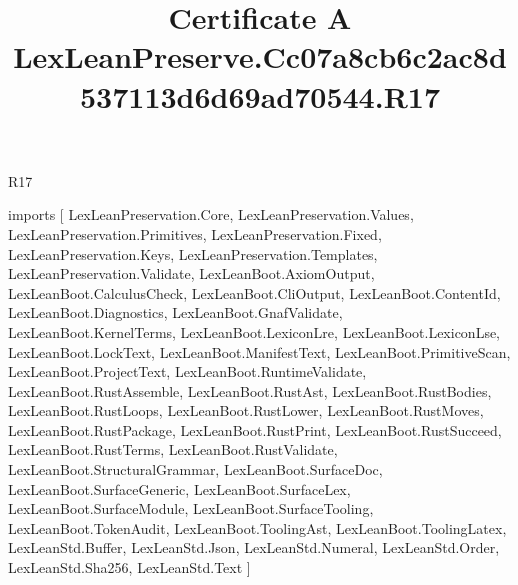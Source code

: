 \begin{lexlean}{R17}
\title{Certificate A LexLeanPreserve.Cc07a8cb6c2ac8d537113d6d69ad70544.R17}
\begin{coremodule}
imports [
  LexLeanPreservation.Core,
  LexLeanPreservation.Values,
  LexLeanPreservation.Primitives,
  LexLeanPreservation.Fixed,
  LexLeanPreservation.Keys,
  LexLeanPreservation.Templates,
  LexLeanPreservation.Validate,
  LexLeanBoot.AxiomOutput,
  LexLeanBoot.CalculusCheck,
  LexLeanBoot.CliOutput,
  LexLeanBoot.ContentId,
  LexLeanBoot.Diagnostics,
  LexLeanBoot.GnafValidate,
  LexLeanBoot.KernelTerms,
  LexLeanBoot.LexiconLre,
  LexLeanBoot.LexiconLse,
  LexLeanBoot.LockText,
  LexLeanBoot.ManifestText,
  LexLeanBoot.PrimitiveScan,
  LexLeanBoot.ProjectText,
  LexLeanBoot.RuntimeValidate,
  LexLeanBoot.RustAssemble,
  LexLeanBoot.RustAst,
  LexLeanBoot.RustBodies,
  LexLeanBoot.RustLoops,
  LexLeanBoot.RustLower,
  LexLeanBoot.RustMoves,
  LexLeanBoot.RustPackage,
  LexLeanBoot.RustPrint,
  LexLeanBoot.RustSucceed,
  LexLeanBoot.RustTerms,
  LexLeanBoot.RustValidate,
  LexLeanBoot.StructuralGrammar,
  LexLeanBoot.SurfaceDoc,
  LexLeanBoot.SurfaceGeneric,
  LexLeanBoot.SurfaceLex,
  LexLeanBoot.SurfaceModule,
  LexLeanBoot.SurfaceTooling,
  LexLeanBoot.TokenAudit,
  LexLeanBoot.ToolingAst,
  LexLeanBoot.ToolingLatex,
  LexLeanStd.Buffer,
  LexLeanStd.Json,
  LexLeanStd.Numeral,
  LexLeanStd.Order,
  LexLeanStd.Sha256,
  LexLeanStd.Text
]


\end{coremodule}
\end{lexlean}
